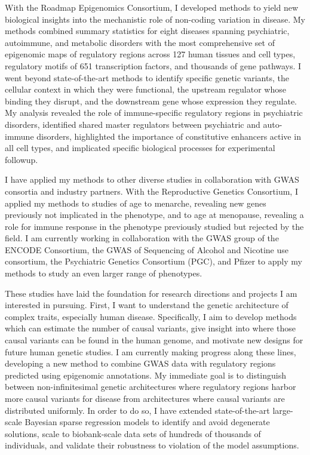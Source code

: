 \documentclass[11pt]{article}
\begin{document}
With the Roadmap Epigenomics Consortium, I developed methods to yield new
biological insights into the mechanistic role of non-coding variation in
disease. My methods combined summary statistics for eight diseases spanning
psychiatric, autoimmune, and metabolic disorders with the most comprehensive
set of epigenomic maps of regulatory regions across 127 human tissues and cell
types, regulatory motifs of 651 transcription factors, and thousands of gene
pathways. I went beyond state-of-the-art methods to identify specific genetic
variants, the cellular context in which they were functional, the upstream
regulator whose binding they disrupt, and the downstream gene whose expression
they regulate. My analysis revealed the role of immune-specific regulatory
regions in psychiatric disorders, identified shared master regulators between
psychiatric and auto-immune disorders, highlighted the importance of
constitutive enhancers active in all cell types, and implicated specific
biological processes for experimental followup.

I have applied my methods to other diverse studies in collaboration with GWAS
consortia and industry partners. With the Reproductive Genetics Consortium, I
applied my methods to studies of age to menarche, revealing new genes
previously not implicated in the phenotype, and to age at menopause, revealing
a role for immune response in the phenotype previously studied but rejected by
the field. I am currently working in collaboration with the GWAS group of the
ENCODE Consortium, the GWAS of Sequencing of Alcohol and Nicotine use
consortium, the Psychiatric Genetics Consortium (PGC), and Pfizer to apply my
methods to study an even larger range of phenotypes.

These studies have laid the foundation for research directions and projects I
am interested in pursuing. First, I want to understand the genetic architecture
of complex traits, especially human disease. Specifically, I aim to develop
methods which can estimate the number of causal variants, give insight into
where those causal variants can be found in the human genome, and motivate new
designs for future human genetic studies. I am currently making progress along
these lines, developing a new method to combine GWAS data with regulatory
regions predicted using epigenomic annotations. My immediate goal is to
distinguish between non-infinitesimal genetic architectures where regulatory
regions harbor more causal variants for disease from architectures where causal
variants are distributed uniformly. In order to do so, I have extended
state-of-the-art large-scale Bayesian sparse regression models to identify and
avoid degenerate solutions, scale to biobank-scale data sets of hundreds of
thousands of individuals, and validate their robustness to violation of the
model assumptions. 
\end{document}
